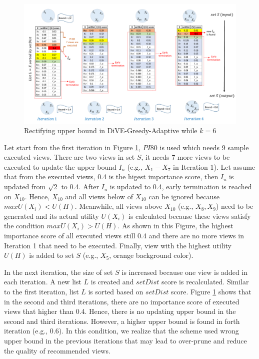 \documentclass{article}
\begin{document}
\begin{figure}
	\begin{center}
		\includegraphics[width=7.0in]{figures/Rectifying_flow_column}
		\vspace{-8pt}
		\caption{Rectifying upper bound in DiVE-Greedy-Adaptive while $k = 6$}
		\label{fig:rectify_logic_column}
		
	\end{center}
\end{figure}
Let start from the first iteration in Figure \ref{fig:rectify_logic_column}, $PI80$ is used which needs 9 sample executed views. There are two views in set $S$, it needs 7 more views to be executed to update the upper bound $I_u$ (e.g., $X_1 - X_7$ in Iteration 1). Let assume that from the executed views, 0.4 is the higest importance score, then $I_u$ is updated from $\sqrt{2}$ to 0.4. After $I_u$ is updated to 0.4, early termination is reached on $X_{10}$. Hence, $X_{10}$ and all views below of $X_{10}$ can be ignored because $maxU(X_i) < U(H)$. Meanwhile, all views above $X_{10}$ (e.g., $X_8, X_9$) need to be generated and its actual utility $U(X_i)$ is calculated because these views satisfy the condition $maxU(X_i) > U(H)$. As shown in this Figure, the highest importance score of all executed views still 0.4 and there are no more views in Iteration 1 that need to be executed. Finally, view with the highest utility $U(H)$ is added to set $S$ (e.g., $X_5$, orange background color). 

In the next iteration, the size of set $S$ is increased because one view is added in each iteration. A new list $L$ is created and $setDist$ score is recalculated. Similar to the first iteration, list $L$ is sorted based on $setDist$ score. 
Figure \ref{fig:rectify_logic_column} shows that in the second and third iterations, there are no importance score of executed views that higher than 0.4. Hence, there is no updating upper bound in the second and third iterations. However, a higher upper bound is found in forth iteration (e.g., 0.6). In this condition, we realize that the scheme used wrong upper bound in the previous iterations that may lead to over-prune and reduce the quality of recommended views. 
\end{document}
